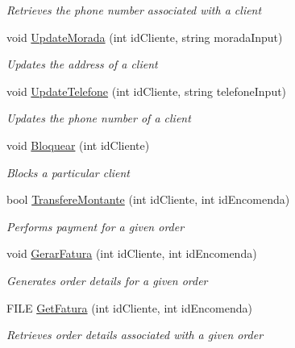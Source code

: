 \begin{DoxyCompactItemize}
\begin{DoxyCompactList}\small\item\em Retrieves the phone number associated with a client \end{DoxyCompactList}\item 
void \mbox{\hyperlink{classmvc_j_j_m_s_1_1_controllers_1_1_cliente_controller_a27719253428ef9593690de0afdba5596}{Update\+Morada}} (int id\+Cliente, string morada\+Input)
\begin{DoxyCompactList}\small\item\em Updates the address of a client \end{DoxyCompactList}\item 
void \mbox{\hyperlink{classmvc_j_j_m_s_1_1_controllers_1_1_cliente_controller_aefbf9f1512ccb78afa9acaef47b95b98}{Update\+Telefone}} (int id\+Cliente, string telefone\+Input)
\begin{DoxyCompactList}\small\item\em Updates the phone number of a client \end{DoxyCompactList}\item 
void \mbox{\hyperlink{classmvc_j_j_m_s_1_1_controllers_1_1_cliente_controller_a75678bb2dcb7f48853343d9bf898d64a}{Bloquear}} (int id\+Cliente)
\begin{DoxyCompactList}\small\item\em Blocks a particular client \end{DoxyCompactList}\item 
bool \mbox{\hyperlink{classmvc_j_j_m_s_1_1_controllers_1_1_cliente_controller_a71e4b089bf6844fd8440ae4571bb6ae0}{Transfere\+Montante}} (int id\+Cliente, int id\+Encomenda)
\begin{DoxyCompactList}\small\item\em Performs payment for a given order \end{DoxyCompactList}\item 
void \mbox{\hyperlink{classmvc_j_j_m_s_1_1_controllers_1_1_cliente_controller_a626d408a5094fabc40454be45b143ab2}{Gerar\+Fatura}} (int id\+Cliente, int id\+Encomenda)
\begin{DoxyCompactList}\small\item\em Generates order details for a given order \end{DoxyCompactList}\item 
F\+I\+LE \mbox{\hyperlink{classmvc_j_j_m_s_1_1_controllers_1_1_cliente_controller_afa8996759fcf65477a9aac44cd0c9810}{Get\+Fatura}} (int id\+Cliente, int id\+Encomenda)
\begin{DoxyCompactList}\small\item\em Retrieves order details associated with a given order \end{DoxyCompactList}\item 

\end{DoxyCompactItemize}
